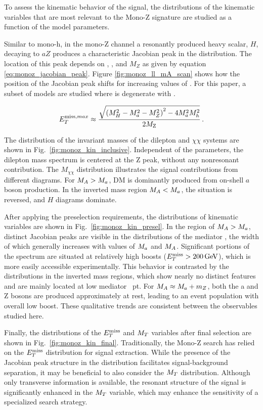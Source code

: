 To assess the kinematic behavior of the signal, the distributions of the kinematic variables that are most relevant to the Mono-Z signature are studied as a function of the model parameters.

Similar to mono-h, in the mono-Z channel a resonantly produced heavy scalar, $H$, decaying to $aZ$ produces a characteristic Jacobian peak in the \MET distribution.  The location of this peak depends on \mH, \ma, and $M_{Z}$ as given by equation \ref{eq:monoz_jacobian_peak}.  Figure \ref{fig:monoz_ll_mA_scan} shows how the position of the Jacobian peak shifts for increasing values of \mH.  For this paper, a subset of models are studied where \mA is degenerate with \mH.    

\begin{align}
E^{\mathrm{miss},max}_T \approx \frac{\sqrt{\left(M_{H}^2 -M_{a}^2 -M_{Z}^2\right)^2 - 4 M_{a}^2 M_{h}^2}}{2M_{\rm{Z}}}\,.
\label{eq:monoZ_jacobian_peak}
\end{align}

The distribution of the invariant masses of the dilepton and $\chi\chi$ systems are shown in Fig.~\ref{fig:monoz_kin_inclusive}. Independent of the parameters, the dilepton mass spectrum is centered at the Z peak, without any nonresonant contribution. The $M_{\chi\chi}$ distribution illustrates the signal contributions from different diagrams. For $M_{A}>M_{a}$, DM is dominantly produced from on-shell $a$ boson production. In the inverted mass region $M_{A}<M_{a}$, the situation is reversed, and $H$ diagrams dominate.

After applying the preselection requirements, the distributions of kinematic variables are shown in Fig.~\ref{fig:monoz_kin_presel}. In the region of $M_{A}>M_{a}$, distinct Jacobian peaks are visible in the distributions of the mediator \pt, the width of which generally increases with values of $M_{a}$ and $M_{A}$. Significant portions of the spectrum are situated at relatively high boosts ($\MET>\unit[200]{GeV}$), which is more easily accessible experimentally.
This behavior is contrasted by the distributions in the inverted mass regions, which show nearly no distinct features and are mainly located at low mediator \
pt. For $M_{A}\approx M_{a}+m_{Z}$, both the a and Z bosons are produced approximately at rest, leading to an event population with overall low boost. These qualitative trends are consistent between the observables studied here.

Finally, the distributions of the $E_T^\mathrm{miss}$ and $M_{T}$ variables after final selection are shown in Fig.~\ref{fig:monoz_kin_final}. Traditionally, the Mono-Z search has relied on the $E_T^\mathrm{miss}$ distribution for signal extraction. While the presence of the Jacobian peak structure in the distribution facilitates signal-background separation, it may be beneficial to also consider the $M_{T}$ distribution. Although only transverse information is available, the resonant structure of the signal is significantly enhanced in the $M_{T}$ variable, which may enhance the sensitivity of a specialized search strategy.

